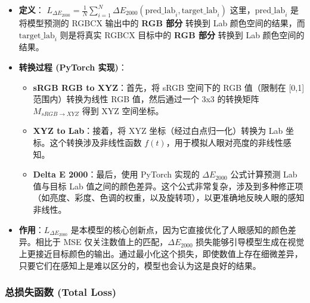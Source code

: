 \begin{itemize}
    \item \textbf{定义}：
    $ L_{\Delta E_{2000}} = \frac{1}{N} \sum_{i=1}^N \Delta E_{2000}(\text{pred\_lab}_i, \text{target\_lab}_i) $
    这里，$\text{pred\_lab}_i$ 是将模型预测的 RGBCX 输出中的 \textbf{RGB 部分} 转换到 Lab 颜色空间的结果，而 $\text{target\_lab}_i$ 则是将真实 RGBCX 目标中的 \textbf{RGB 部分} 转换到 Lab 颜色空间的结果。
    \item \textbf{转换过程 (PyTorch 实现)}：
        \begin{itemize}
            \item \textbf{sRGB RGB to XYZ}：首先，将 sRGB 空间下的 RGB 值（限制在 [0,1] 范围内）转换为线性 RGB 值，然后通过一个 3x3 的转换矩阵 $M_{sRGB \to XYZ}$ 得到 XYZ 空间坐标。
            \item \textbf{XYZ to Lab}：接着，将 XYZ 坐标（经过白点归一化）转换为 Lab 坐标。这个转换涉及非线性函数 $f(t)$，用于模拟人眼对亮度的非线性感知。
            \item \textbf{Delta E 2000}：最后，使用 PyTorch 实现的 $\Delta E_{2000}$ 公式计算预测 Lab 值与目标 Lab 值之间的颜色差异。这个公式非常复杂，涉及到多种修正项（如亮度、彩度、色调的权重，以及旋转项），以更准确地反映人眼的感知非线性。 
        \end{itemize}
    \item \textbf{作用}：$L_{\Delta E_{2000}}$ 是本模型的核心创新点，因为它直接优化了人眼感知的颜色差异。相比于 MSE 仅关注数值上的匹配，$\Delta E_{2000}$ 损失能够引导模型生成在视觉上更接近目标颜色的输出。通过最小化这个损失，即使数值上存在细微差异，只要它们在感知上是难以区分的，模型也会认为这是良好的结果。
\end{itemize}

\subsubsection[\hspace{-2pt}总损失函数 (Total Loss)]{{\heiti{} \hspace{-8pt}总损失函数 (Total Loss)}}\label{section2: Total Loss}

